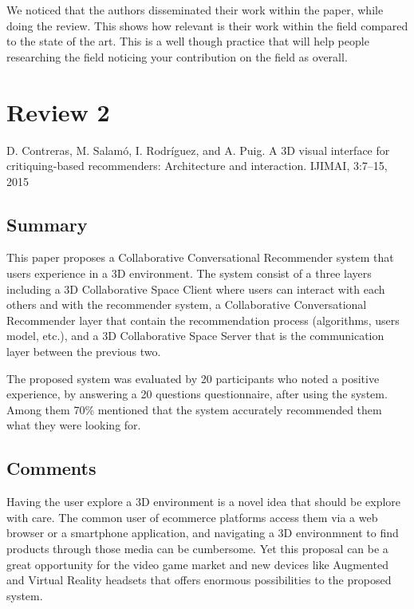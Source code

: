 \documentclass{article}
\begin{document}
We noticed that the authors disseminated their work within the paper, while
doing the review. This shows how relevant is their work within the field
compared to the state of the art. This is a well though practice that will
help people researching the field noticing your contribution on the field
as overall.


\section*{Review 2}
D. Contreras, M. Salamó, I. Rodríguez, and A. Puig. A 3D visual interface for
critiquing-based recommenders: Architecture and interaction.
IJIMAI, 3:7–15, 2015

\subsection*{Summary}

This paper proposes a Collaborative Conversational Recommender system that
users experience in a 3D environment. The system consist of a three layers
including a 3D Collaborative Space Client where users can interact with each
others and with the recommender system, a Collaborative Conversational
Recommender layer that contain the recommendation process (algorithms, users
model, etc.), and a 3D Collaborative Space Server that is the communication
layer between the previous two.

The proposed system was evaluated by 20 participants who noted a positive
experience, by answering a 20 questions questionnaire, after using the system.
Among them 70\% mentioned that the system accurately recommended them what
they were looking for. 

\subsection*{Comments}

Having the user explore a 3D environment is a novel idea that should be
explore with care. The common user of ecommerce platforms access them via
a web browser or a smartphone application, and navigating a 3D environmnent
to find products through those media can be cumbersome. Yet this proposal
can be a great opportunity for the video game market and new devices like
Augmented and  Virtual Reality headsets that offers enormous possibilities
to the proposed system.
\end{document}

